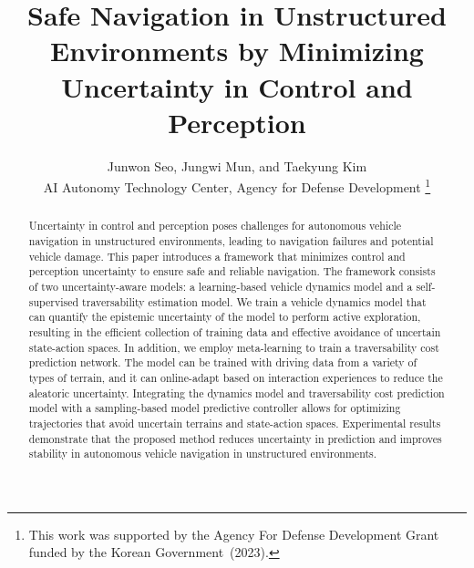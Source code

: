 \documentclass[conference]{IEEEtran}
\begin{document}
\title{
Safe Navigation in Unstructured Environments by Minimizing Uncertainty in Control and Perception
}

\author{Junwon Seo, Jungwi Mun, and Taekyung Kim \\
AI Autonomy Technology Center, Agency for Defense Development
\thanks{This work was supported by the Agency For Defense Development Grant funded by the Korean Government~(2023).}
}

\makeatletter
\makeatother

\maketitle


\begin{abstract}
Uncertainty in control and perception poses challenges for autonomous vehicle navigation in unstructured environments, leading to navigation failures and potential vehicle damage. This paper introduces a framework that minimizes control and perception uncertainty to ensure safe and reliable navigation. The framework consists of two uncertainty-aware models: a learning-based vehicle dynamics model and a self-supervised traversability estimation model. We train a vehicle dynamics model that can quantify the epistemic uncertainty of the model to perform active exploration, resulting in the efficient collection of training data and effective avoidance of uncertain state-action spaces. In addition, we employ meta-learning to train a traversability cost prediction network. The model can be trained with driving data from a variety of types of terrain, and it can online-adapt based on interaction experiences to reduce the aleatoric uncertainty. Integrating the dynamics model and traversability cost prediction model with a sampling-based model predictive controller allows for optimizing trajectories that avoid uncertain terrains and state-action spaces. Experimental results demonstrate that the proposed method reduces uncertainty in prediction and improves stability in autonomous vehicle navigation in unstructured environments.
\end{abstract}
\IEEEpeerreviewmaketitle

\end{document}
